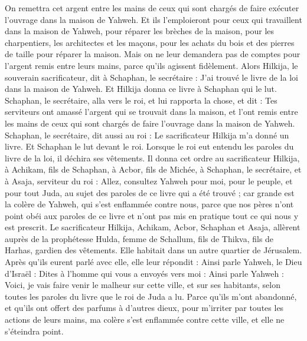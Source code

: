 \begin{multicols}{2}
On remettra cet argent entre les mains de ceux qui sont chargés de faire exécuter l’ouvrage dans la maison de Yahweh. Et ils l’emploieront pour ceux qui travaillent dans la maison de Yahweh, pour réparer les brèches de la maison,
pour les charpentiers, les architectes et les maçons, pour les achats du bois et des pierres de taille pour réparer la maison.
Mais on ne leur demandera pas de comptes pour l’argent remis entre leurs mains, parce qu’ils agissent fidèlement.
Alors Hilkija, le souverain sacrificateur, dit à Schaphan, le secrétaire : J’ai trouvé le livre de la loi dans la maison de Yahweh. Et Hilkija donna ce livre à Schaphan qui le lut.
Schaphan, le secrétaire, alla vers le roi, et lui rapporta la chose, et dit : Tes serviteurs ont amassé l’argent qui se trouvait dans la maison, et l’ont remis entre les mains de ceux qui sont chargés de faire l’ouvrage dans la maison de Yahweh.
Schaphan, le secrétaire, dit aussi au roi : Le sacrificateur Hilkija m’a donné un livre. Et Schaphan le lut devant le roi.
Lorsque le roi eut entendu les paroles du livre de la loi, il déchira ses vêtements.
Il donna cet ordre au sacrificateur Hilkija, à Achikam, fils de Schaphan, à Acbor, fils de Michée, à Schaphan, le secrétaire, et à Asaja, serviteur du roi :
Allez, consultez Yahweh pour moi, pour le peuple, et pour tout Juda, au sujet des paroles de ce livre qui a été trouvé ; car grande est la colère de Yahweh, qui s’est enflammée contre nous, parce que nos pères n’ont point obéi aux paroles de ce livre et n’ont pas mis en pratique tout ce qui nous y est prescrit.
Le sacrificateur Hilkija, Achikam, Acbor, Schaphan et Asaja, allèrent auprès de la prophétesse Hulda, femme de Schallum, fils de Thikva, fils de Harhas, gardien des vêtements. Elle habitait dans un autre quartier de Jérusalem.
Après qu’ils eurent parlé avec elle, elle leur répondit : Ainsi parle Yahweh, le Dieu d’Israël : Dites à l’homme qui vous a envoyés vers moi :
Ainsi parle Yahweh : Voici, je vais faire venir le malheur sur cette ville, et sur ses habitants, selon toutes les paroles du livre que le roi de Juda a lu.
Parce qu’ils m’ont abandonné, et qu’ils ont offert des parfums à d’autres dieux, pour m’irriter par toutes les actions de leurs mains, ma colère s’est enflammée contre cette ville, et elle ne s’éteindra point.

\end{multicols}
